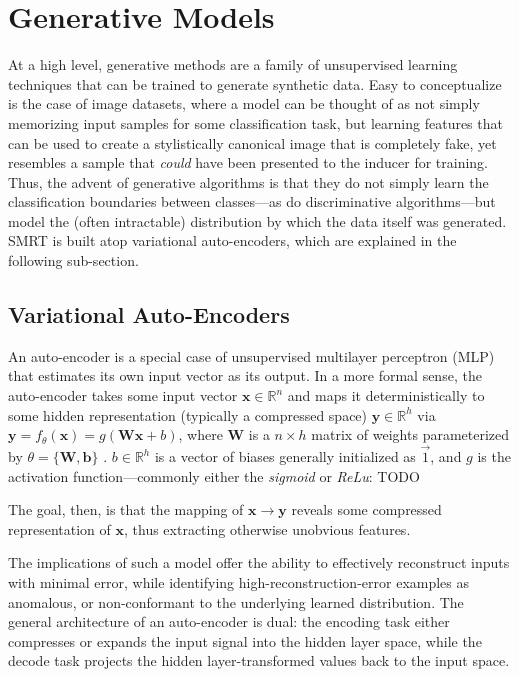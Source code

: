 \documentclass[twoside,11pt]{article}
\begin{document}
\section{Generative Models}

At a high level, generative methods are a family of unsupervised learning techniques that can be trained to generate synthetic data. Easy to conceptualize is the case of image datasets, where a model can be thought of as not simply memorizing input samples for some classification task, but learning features that can be used to create a stylistically canonical image that is completely fake, yet resembles a sample that \emph{could} have been presented to the inducer for training. Thus, the advent of generative algorithms is that they do not simply learn the classification boundaries between classes---as do discriminative algorithms---but model the (often intractable) distribution by which the data itself was generated. SMRT is built atop variational auto-encoders, which are explained in the following sub-section.

\subsection{Variational Auto-Encoders}

An auto-encoder is a special case of unsupervised multilayer perceptron (MLP) that estimates its own input vector as its output. In a more formal sense, the auto-encoder takes some input vector $\mathbf{x} \in  \mathbb{R}^{n}$ and maps it deterministically to some hidden representation (typically a compressed space) $\mathbf{y} \in  \mathbb{R}^{h}$ via $\mathbf{y} = f_{\theta}(\mathbf{x}) = g(\mathbf{Wx} + b)$, where $\mathbf{W}$ is a $n \times h$ matrix of weights parameterized by $\theta = \{\mathbf{W, b}\}$ \citep{meyer2015introduction}. $b \in \mathbb{R}^{h}$ is a vector of biases generally initialized as $\vec{1}$, and $g$ is the activation function---commonly either the \emph{sigmoid} or \emph{ReLu}: TODO

The goal, then, is that the mapping of $\mathbf{x} \rightarrow \mathbf{y}$ reveals some compressed representation of $\mathbf{x}$, thus extracting otherwise unobvious features.

The implications of such a model offer the ability to effectively reconstruct inputs with minimal error, while identifying high-reconstruction-error examples as anomalous, or non-conformant to the underlying learned distribution. The general architecture of an auto-encoder is dual: the encoding task either compresses or expands the input signal into the hidden layer space, while the decode task projects the hidden layer-transformed values back to the input space.
\end{document}
